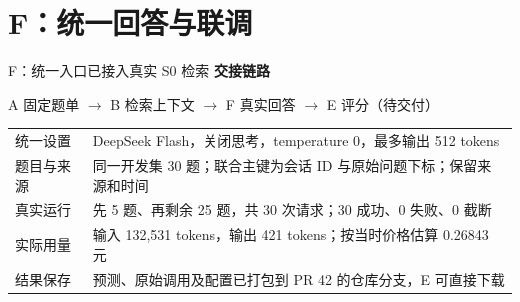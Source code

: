 \section{F：统一回答与联调}
\begin{frame}{F：统一入口已接入真实 S0 检索}
\small
\textbf{交接链路}\par\vspace{2mm}
A 固定题单 $\longrightarrow$ B 检索上下文 $\longrightarrow$ F 真实回答
$\longrightarrow$ E 评分（待交付）\par\vspace{3mm}
\begin{tabularx}{\linewidth}{@{}p{31mm}Y@{}}
\toprule
统一设置 & DeepSeek Flash，关闭思考，temperature 0，最多输出 512 tokens\\[1mm]
题目与来源 & 同一开发集 30 题；联合主键为会话 ID 与原始问题下标；保留来源和时间\\[1mm]
真实运行 & 先 5 题、再剩余 25 题，共 30 次请求；30 成功、0 失败、0 截断\\[1mm]
实际用量 & 输入 132,531 tokens，输出 421 tokens；按当时价格估算 0.26843 元\\[1mm]
结果保存 & 预测、原始调用及配置已打包到 PR 42 的仓库分支，E 可直接下载\\
\bottomrule
\end{tabularx}\par\vspace{2mm}
\end{frame}

